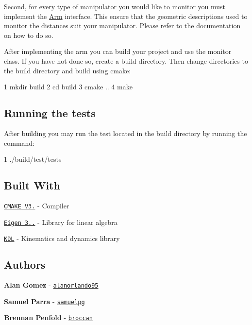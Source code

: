 Second, for every type of manipulator you would like to monitor you must implement the \hyperlink{class_arm}{Arm} interface. This ensure that the geometric descriptions used to monitor the distances suit your manipulator. Please refer to the documentation on how to do so.

After implementing the arm you can build your project and use the monitor class. If you have not done so, create a build directory. Then change directories to the build directory and build using cmake\+:


\begin{DoxyCode}
1 mkdir build
2 cd build
3 cmake ..
4 make
\end{DoxyCode}


\subsection*{Running the tests}

After building you may run the test located in the build directory by running the command\+:


\begin{DoxyCode}
1 ./build/test/tests
\end{DoxyCode}


\subsection*{Built With}


\begin{DoxyItemize}
\item \href{https://cmake.org/download/}{\tt C\+M\+A\+KE V3.} -\/ Compiler
\item \href{http://eigen.tuxfamily.org}{\tt Eigen 3..} -\/ Library for linear algebra
\item \href{https://www.orocos.org/kdl/installation-manual}{\tt K\+DL} -\/ Kinematics and dynamics library
\end{DoxyItemize}

\subsection*{Authors}


\begin{DoxyItemize}
\item {\bfseries Alan Gomez} -\/ \href{https://github.com/alanorlando95}{\tt alanorlando95}
\item {\bfseries Samuel Parra} -\/ \href{https://github.com/samuelpg}{\tt samuelpg}
\item {\bfseries Brennan Penfold} -\/ \href{https://github.com/broccan}{\tt broccan}
\end{DoxyItemize}

